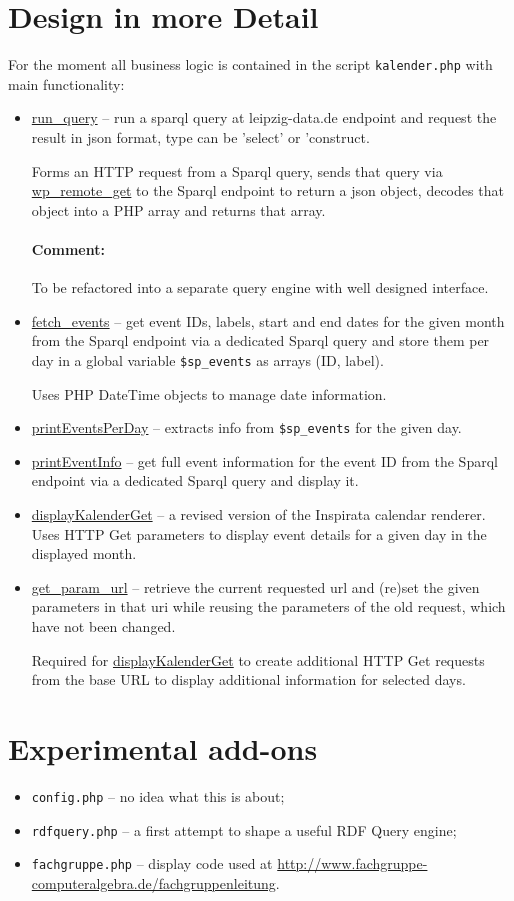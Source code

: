 \documentclass[11pt,a4paper]{article}
\newcommand{\comment}[1]{\par\paragraph{Comment:} #1}
\begin{document}
\section{Design in more Detail}

For the moment all business logic is contained in the script
\texttt{kalender.php} with main functionality:
\begin{itemize}
\item \url{run_query} -- run a sparql query at leipzig-data.de endpoint
  and request the result in json format, type can be 'select' or 'construct.

  Forms an HTTP request from a Sparql query, sends that query via
  \url{wp_remote_get} to the Sparql endpoint to return a json object, decodes
  that object into a PHP array and returns that array.

  \comment{To be refactored into a separate query engine with well designed
    interface.} 

\item \url{fetch_events} -- get event IDs, labels, start and end dates for the
  given month from the Sparql endpoint via a dedicated Sparql query and store
  them per day in a global variable \texttt{\$sp\_events} as arrays (ID,
  label).

  Uses PHP DateTime objects to manage date information. 

\item \url{printEventsPerDay} -- extracts info from \texttt{\$sp\_events} for
  the given day.

\item \url{printEventInfo} -- get full event information for the event ID from
  the Sparql endpoint via a dedicated Sparql query and display it.

\item \url{displayKalenderGet} -- a revised version of the Inspirata calendar
  renderer.  Uses HTTP Get parameters to display event details for a given day
  in the displayed month. 

\item \url{get_param_url} -- retrieve the current requested url and (re)set
  the given parameters in that uri while reusing the parameters of the old
  request, which have not been changed.

  Required for \url{displayKalenderGet} to create additional HTTP Get requests
  from the base URL to display additional information for selected days. 

\end{itemize}

\section{Experimental add-ons}

\begin{itemize}
\item \texttt{config.php} -- no idea what this is about;     
\item \texttt{rdfquery.php} -- a first attempt to shape a useful RDF Query
  engine;
\item \texttt{fachgruppe.php} -- display code used at
  \url{http://www.fachgruppe-computeralgebra.de/fachgruppenleitung}.
\end{itemize}
\end{document}
